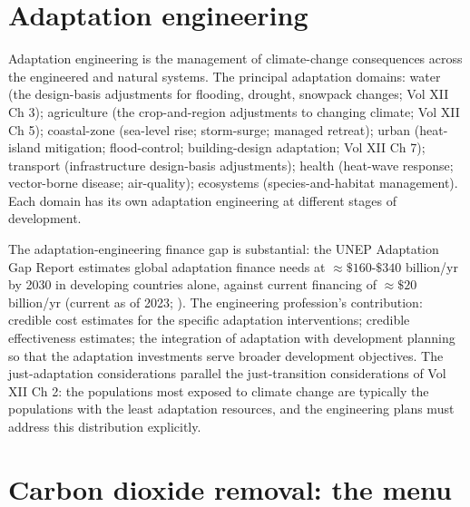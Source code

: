 \section{Adaptation engineering}

Adaptation engineering is the management of climate-change consequences across the engineered and natural systems. The principal adaptation domains: water (the design-basis adjustments for flooding, drought, snowpack changes; Vol XII Ch 3); agriculture (the crop-and-region adjustments to changing climate; Vol XII Ch 5); coastal-zone (sea-level rise; storm-surge; managed retreat); urban (heat-island mitigation; flood-control; building-design adaptation; Vol XII Ch 7); transport (infrastructure design-basis adjustments); health (heat-wave response; vector-borne disease; air-quality); ecosystems (species-and-habitat management). Each domain has its own adaptation engineering at different stages of development.

The adaptation-engineering finance gap is substantial: the UNEP Adaptation Gap Report estimates global adaptation finance needs at $\approx \$160$-$\$340$ billion/yr by 2030 in developing countries alone, against current financing of $\approx \$20$ billion/yr (current as of 2023; \cite{web:unep-adaptation-gap-2023}). The engineering profession's contribution: credible cost estimates for the specific adaptation interventions; credible effectiveness estimates; the integration of adaptation with development planning so that the adaptation investments serve broader development objectives. The just-adaptation considerations parallel the just-transition considerations of Vol XII Ch 2: the populations most exposed to climate change are typically the populations with the least adaptation resources, and the engineering plans must address this distribution explicitly.

\section{Carbon dioxide removal: the menu}

